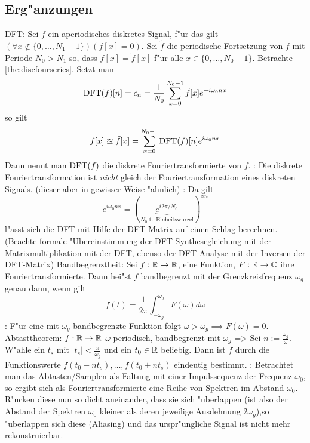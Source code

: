 \subsection{Erg"anzungen}
 DFT:{
  Sei $f$ ein aperiodisches diskretes Signal, f"ur das gilt 
  $(\forall x\not\in\{0,\ldots,N_1-1\})(f[x]=0)$. 
  Sei $\tilde f$ die periodische Fortsetzung von $f$ mit Periode $N_0>N_1$ so,
  dass $f[x]=\tilde f[x]$ f"ur alle $x\in\{0,\ldots,N_0-1\}$.
  Betrachte \ref{the:discfourseries}. Setzt man
  \[
    \DFT(f)[n]=c_n=\frac 1 {N_0} \sum_{x=0}^{N_0-1} \tilde f[x] e^{-i\omega_0 nx}
  \]
  so gilt
  \[
    f[x]\approxeq\tilde f[x]=\sum_{x=0}^{N_0-1} \DFT(f)[n] e^{i\omega_0 nx}
  \]
  Dann nennt man $\operatorname{DFT}(f)$ die diskrete Fouriertransformierte von $f$.
}
\remark:{
  Die diskrete Fouriertransformation ist \emph{nicht} gleich der
  Fouriertransformation eines diskreten Signals. (dieser aber in gewisser
  Weise "ahnlich)
}
\remark:{
  Da gilt 
  \[
    e^{i\omega_0 nx}=
      (\underbrace{e^{i 2\pi/N_0}}_{\text{$N_0$-te Einheitswurzel}})^{xn}
  \]
  l"asst sich die DFT mit Hilfe der DFT-Matrix auf einen
  Schlag berechnen. (Beachte formale "Ubereinstimmung der DFT-Synthesegleichung
  mit der Matrixmultiplikation mit der DFT, ebenso der DFT-Analyse mit der
  Inversen der DFT-Matrix)
}
 Bandbegrenztheit:{
  Sei $f:\mathbb R\to\mathbb R$, eine Funktion, $F:\mathbb R\to\mathbb C$ ihre 
  Fouriertransformierte. Dann hei"st $f$ bandbegrenzt mit der 
  Grenzkreisfrequenz $\omega_g$ genau dann, wenn gilt
  \[
    f(t)=\frac 1 {2\pi} \int_{-\omega_g}^{\omega_g} F(\omega) d\omega
  \]
}
\remark:{
  F"ur eine mit $\omega_g$ bandbegrenzte Funktion folgt 
  $\omega>\omega_g\implies F(\omega)=0$.
}
\theorem Abtasttheorem:
  $f:\mathbb R\to\mathbb R$ $\omega$-periodisch, bandbegrenzt mit $\omega_g$
  =>
{
  Sei $n:=\frac {\omega_g}\omega$. 
  W"ahle ein $t_s$ mit $|t_s|<\frac \pi {\omega_g}$ und ein $t_0\in\mathbb R$
  beliebig.
  Dann ist $f$ durch die Funktionswerte $f(t_0-nt_s),\ldots,f(t_0+nt_s)$
  eindeutig bestimmt.
}
\remark:{
  Betrachtet man das Abtasten/Samplen als Faltung mit einer
  Impulssequenz der Frequenz $\omega_0$, so ergibt sich als 
  Fouriertransformierte eine Reihe von Spektren im Abstand $\omega_0$. 
  R"ucken diese nun so dicht aneinander, dass sie sich "uberlappen 
  (ist also der Abstand der Spektren $\omega_0$ kleiner als deren 
  jeweilige Ausdehnung $2\omega_g$),so "uberlappen sich diese (Aliasing) 
  und das urspr"ungliche Signal ist nicht mehr rekonstruierbar.
}
